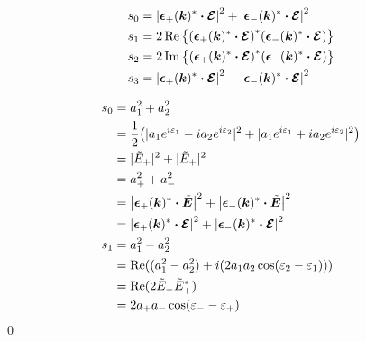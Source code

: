 \documentclass[uplatex,dvipdfmx,a4paper,11pt]{jlreq}
\makeatletter
\newcommand{\kk}{\bm{k}}
\newcommand{\ET}{\tilde{\bm{E}}}
\newcommand{\EC}{\vb*{\mathcal{E}}}
\newcommand{\ee}{\bm{\epsilon}}
\theoremstyle{definition}
\renewenvironment{proof}[1][\proofname]{\par
  \normalfont
  \topsep6\p@\@plus6\p@ \trivlist
  \item[\hskip\labelsep{\bfseries #1}\@addpunct{\bfseries}]\ignorespaces\quad\par
}{%
  \qed\endtrivlist\@endpefalse
}
\renewcommand\proofname{証明}
\makeatother
\begin{document}
\begin{proposition}
  \begin{align}
    s_0 & = \qty|\ee_+(\kk)^*\vdot\EC|^2 + \qty|\ee_-(\kk)^*\vdot\EC|^2      \\
    s_1 & = 2\Re\qty{\qty(\ee_+(\kk)^*\vdot\EC)^*\qty(\ee_-(\kk)^*\vdot\EC)} \\
    s_2 & = 2\Im\qty{\qty(\ee_+(\kk)^*\vdot\EC)^*\qty(\ee_-(\kk)^*\vdot\EC)} \\
    s_3 & = \qty|\ee_+(\kk)^*\vdot\EC|^2 - \qty|\ee_-(\kk)^*\vdot\EC|^2
  \end{align}
\end{proposition}
\begin{proof}
  \begin{align}
    s_0 & = a_1^2 + a_2^2                                                                                                              \\
        & = \frac{1}{2}\qty(|a_1e^{i\varepsilon_1} - i a_2e^{i\varepsilon_2}|^2 + |a_1e^{i\varepsilon_1} + i a_2e^{i\varepsilon_2}|^2) \\
        & = |\tilde{E}_+|^2 + |\tilde{E}_+|^2                                                                                          \\
        & = a_+^2 + a_-^2                                                                                                              \\
        & = \qty|\ee_+(\kk)^*\vdot\ET|^2 + \qty|\ee_-(\kk)^*\vdot\ET|^2                                                                \\
        & = \qty|\ee_+(\kk)^*\vdot\EC|^2 + \qty|\ee_-(\kk)^*\vdot\EC|^2                                                                \\
    s_1 & = a_1^2 - a_2^2                                                                                                              \\
        & = \Re((a_1^2 - a_2^2) + i(2a_1a_2\cos(\varepsilon_2 - \varepsilon_1)))                                                       \\
        & = \Re(2\tilde{E}_-\tilde{E}_+^*)                                                                                             \\
        & = 2a_+a_-\cos(\varepsilon_- - \varepsilon_+)                                                                                 \\

\end{align}
\end{proof}
\end{document}
